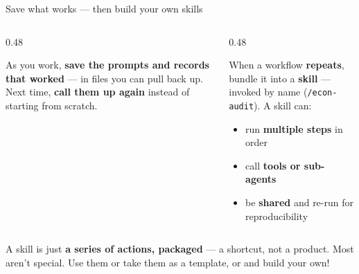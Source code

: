 \documentclass[aspectratio=169, 10pt]{beamer}
\begin{document}
\begin{frame}[fragile]{Save what works --- then build your own skills}
\vskip4pt
\begin{columns}[T]
\begin{column}{0.48\textwidth}
\begin{tcolorbox}[keybox, title={\faSave\quad 1. Save \& reuse}, top=3pt, bottom=3pt]
\small
As you work, \textbf{save the prompts and records that worked} --- in files you can pull back up.
\vskip4pt
Next time, \textbf{call them up again} instead of starting from scratch.
\end{tcolorbox}
\end{column}
\begin{column}{0.48\textwidth}
\begin{tcolorbox}[keybox, title={\faMagic\quad 2. Package a skill}, top=3pt, bottom=3pt]
\small
When a workflow \textbf{repeats}, bundle it into a \textbf{skill} --- invoked by name (\texttt{/econ-audit}). A skill can:
\vskip2pt
\begin{itemize}\setlength{\itemsep}{1pt}
  \item run \textbf{multiple steps} in order
  \item call \textbf{tools or sub-agents}
  \item be \textbf{shared} and re-run for reproducibility
\end{itemize}
\end{tcolorbox}
\end{column}
\end{columns}
\vskip8pt
\begin{tcolorbox}[coralbox, title={\faExclamationCircle\quad We have some skills you can use, and they're fine.}, top=3pt, bottom=3pt]
\small A skill is just \textbf{a series of actions, packaged} --- a shortcut, not a product. Most aren't special. Use them or take them as a template, or  and build your own!
\end{tcolorbox}
\end{frame}
%
\end{document}
